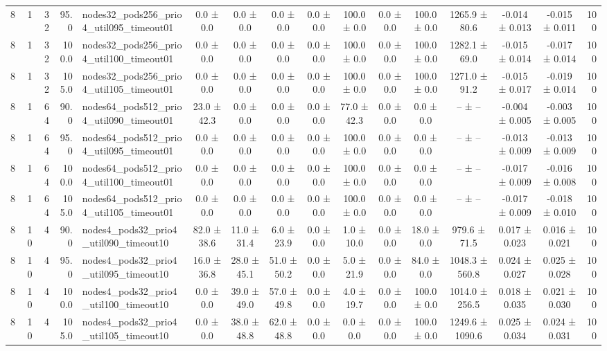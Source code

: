 \begin{tabular}{r r r r l c c c c c c c c c c r}
8 & 1 & 32 & 95.0 & nodes32\_pods256\_prio4\_util095\_timeout01 & 0.0 ± 0.0 & 0.0 ± 0.0 & 0.0 ± 0.0 & 0.0 ± 0.0 & 100.0 ± 0.0 & 0.0 ± 0.0 & 100.0 ± 0.0 & 1265.9 ± 80.6 & -0.014 ± 0.013 & -0.015 ± 0.011 & 100 \\
8 & 1 & 32 & 100.0 & nodes32\_pods256\_prio4\_util100\_timeout01 & 0.0 ± 0.0 & 0.0 ± 0.0 & 0.0 ± 0.0 & 0.0 ± 0.0 & 100.0 ± 0.0 & 0.0 ± 0.0 & 100.0 ± 0.0 & 1282.1 ± 69.0 & -0.015 ± 0.014 & -0.017 ± 0.014 & 100 \\
8 & 1 & 32 & 105.0 & nodes32\_pods256\_prio4\_util105\_timeout01 & 0.0 ± 0.0 & 0.0 ± 0.0 & 0.0 ± 0.0 & 0.0 ± 0.0 & 100.0 ± 0.0 & 0.0 ± 0.0 & 100.0 ± 0.0 & 1271.0 ± 91.2 & -0.015 ± 0.017 & -0.019 ± 0.014 & 100 \\
8 & 1 & 64 & 90.0 & nodes64\_pods512\_prio4\_util090\_timeout01 & 23.0 ± 42.3 & 0.0 ± 0.0 & 0.0 ± 0.0 & 0.0 ± 0.0 & 77.0 ± 42.3 & 0.0 ± 0.0 & 0.0 ± 0.0 & -- ± -- & -0.004 ± 0.005 & -0.003 ± 0.005 & 100 \\
8 & 1 & 64 & 95.0 & nodes64\_pods512\_prio4\_util095\_timeout01 & 0.0 ± 0.0 & 0.0 ± 0.0 & 0.0 ± 0.0 & 0.0 ± 0.0 & 100.0 ± 0.0 & 0.0 ± 0.0 & 0.0 ± 0.0 & -- ± -- & -0.013 ± 0.009 & -0.013 ± 0.009 & 100 \\
8 & 1 & 64 & 100.0 & nodes64\_pods512\_prio4\_util100\_timeout01 & 0.0 ± 0.0 & 0.0 ± 0.0 & 0.0 ± 0.0 & 0.0 ± 0.0 & 100.0 ± 0.0 & 0.0 ± 0.0 & 0.0 ± 0.0 & -- ± -- & -0.017 ± 0.009 & -0.016 ± 0.008 & 100 \\
8 & 1 & 64 & 105.0 & nodes64\_pods512\_prio4\_util105\_timeout01 & 0.0 ± 0.0 & 0.0 ± 0.0 & 0.0 ± 0.0 & 0.0 ± 0.0 & 100.0 ± 0.0 & 0.0 ± 0.0 & 0.0 ± 0.0 & -- ± -- & -0.017 ± 0.009 & -0.018 ± 0.010 & 100 \\
8 & 10 & 4 & 90.0 & nodes4\_pods32\_prio4\_util090\_timeout10 & 82.0 ± 38.6 & 11.0 ± 31.4 & 6.0 ± 23.9 & 0.0 ± 0.0 & 1.0 ± 10.0 & 0.0 ± 0.0 & 18.0 ± 0.0 & 979.6 ± 71.5 & 0.017 ± 0.023 & 0.016 ± 0.021 & 100 \\
8 & 10 & 4 & 95.0 & nodes4\_pods32\_prio4\_util095\_timeout10 & 16.0 ± 36.8 & 28.0 ± 45.1 & 51.0 ± 50.2 & 0.0 ± 0.0 & 5.0 ± 21.9 & 0.0 ± 0.0 & 84.0 ± 0.0 & 1048.3 ± 560.8 & 0.024 ± 0.027 & 0.025 ± 0.028 & 100 \\
8 & 10 & 4 & 100.0 & nodes4\_pods32\_prio4\_util100\_timeout10 & 0.0 ± 0.0 & 39.0 ± 49.0 & 57.0 ± 49.8 & 0.0 ± 0.0 & 4.0 ± 19.7 & 0.0 ± 0.0 & 100.0 ± 0.0 & 1014.0 ± 256.5 & 0.018 ± 0.035 & 0.021 ± 0.030 & 100 \\
8 & 10 & 4 & 105.0 & nodes4\_pods32\_prio4\_util105\_timeout10 & 0.0 ± 0.0 & 38.0 ± 48.8 & 62.0 ± 48.8 & 0.0 ± 0.0 & 0.0 ± 0.0 & 0.0 ± 0.0 & 100.0 ± 0.0 & 1249.6 ± 1090.6 & 0.025 ± 0.034 & 0.024 ± 0.031 & 100 \\

\end{tabular}
